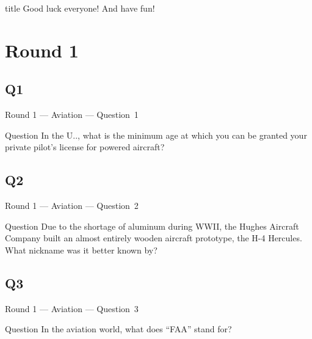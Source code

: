 \documentclass[11pt]{beamer}
\begin{document}
\begingroup{}
\begin{frame}
\vfill{}
\begin{beamercolorbox}[sep=8pt,center,shadow=true,rounded=true]{title}
Good luck everyone! And have fun!
\end{beamercolorbox}
\vfill{}
\end{frame}
\endgroup{}
\def\thisSectionName{Aviation}
\section{Round 1}
\subsection*{Q1}
\begin{frame}[t]{Round 1 --- Aviation --- \mbox{Question 1}}
\vspace{-0.5em}
\begin{block}{Question}
In the U.\@S.\@, what is the minimum age at which you can be granted your private pilot's license for powered aircraft?
\end{block}
\end{frame}
\subsection*{Q2}
\begin{frame}[t]{Round 1 --- Aviation --- \mbox{Question 2}}
\vspace{-0.5em}
\begin{block}{Question}
Due to the shortage of aluminum during WWII, the Hughes Aircraft Company built an almost entirely wooden aircraft prototype, the H-4 Hercules. What nickname was it better known by?
\end{block}
\end{frame}
\subsection*{Q3}
\begin{frame}[t]{Round 1 --- Aviation --- \mbox{Question 3}}
\vspace{-0.5em}
\begin{block}{Question}
In the aviation world, what does ``FAA'' stand for?
\end{block}
\end{frame}
\end{document}
